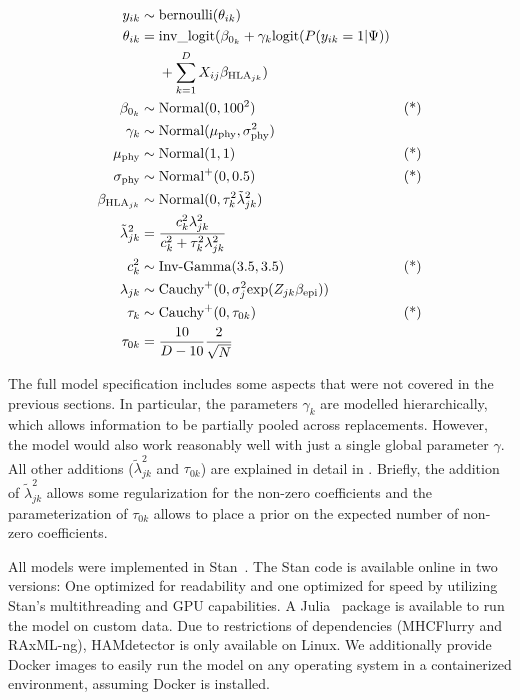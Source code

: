 \documentclass[fleqn,11pt]{SelfArx} %
\begin{document}
\begin{equation}
  \label{eq:full}
  \begin{aligned}
   y_{ik} &\sim \text{bernoulli}(\theta_{ik}) &\\
   \theta_{ik} &=
        \text{inv\_logit}(\beta_{0_{k}} + \gamma_{k}\text{logit}(P(y_{ik}=1|\Psi)) & \\
        \hspace{-6cm} &~~~~ +\sum_{k=1}^{D}X_{ij}\beta_{\text{HLA}_{jk}}) & \\
    \beta_{0_{k}} &\sim \text{Normal}(0, 100^2) & \text{(*)}\\
   \gamma_{k} &\sim \text{Normal}(\mu_{\text{phy}}, \sigma_{\text{phy}}^2) & \\
    \mu_{\text{phy}} &\sim \text{Normal}(1, 1) & \text{(*)} \\
   \sigma_{\text{phy}} &\sim \text{Normal}^{+}(0, 0.5) & \text{(*)} \\
   \beta_{\text{HLA}_{jk}} &\sim \text{Normal}(0, \tau_{k}^{2}\tilde{\lambda}^{2}_{jk}) & \\
   \tilde{\lambda}^{2}_{jk} &= \frac{c_{k}^{2}\lambda_{jk}^{2}}{c_{k}^{2} + \tau_{k}^{2}\lambda_{jk}^{2}} & \\
    c_{k}^2 &\sim \text{Inv-Gamma}(3.5, 3.5) & \text{(*)} \\
   \lambda_{jk} &\sim \text{Cauchy}^{+}(0, \sigma_{j}^2\text{exp}(Z_{jk}\beta_{\text{epi}})) & \\
   \tau_{k} &\sim \text{Cauchy}^{+}(0, \tau_{0k}) & \text{(*)} \\
   \tau_{0k} &= \frac{10}{D-10}\frac{2}{\sqrt{N}} & \\
  \end{aligned}
\end{equation}

The full model specification includes some aspects that were not covered in the previous sections. In particular, the parameters \(\gamma_{k}\) are modelled hierarchically, which allows information to be partially pooled across replacements. However, the model would also work reasonably well with just a single global parameter \(\gamma\). All other additions (\(\tilde{\lambda}_{jk}^{2}\) and \(\tau_{0k}\)) are explained in detail in \cite{Piironen2017}. Briefly, the addition of  \(\tilde{\lambda}_{jk}^{2}\) allows some regularization for the non-zero coefficients and the parameterization of \(\tau_{0k}\) allows to place a prior on the expected number of non-zero coefficients.

All models were implemented in Stan~\cite{Stan2021}. The Stan code is available online in two versions: One optimized for readability and one optimized for speed by utilizing Stan's multithreading and GPU capabilities.
A Julia~\cite{Bezanson2017} package is available to run the model on custom data. Due to restrictions of dependencies (MHCFlurry and RAxML-ng), HAMdetector is only available on Linux. We additionally provide Docker images to easily run the model on any operating system in a containerized environment, assuming Docker is installed. 
\end{document}
